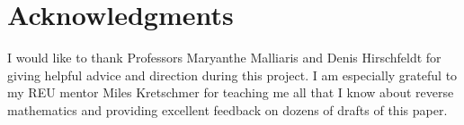 \documentclass{amsart}
\begin{document}
	\section*{Acknowledgments}
	
	I would like to thank Professors Maryanthe Malliaris and Denis Hirschfeldt for giving helpful advice and direction during this project. I am especially grateful to my REU mentor Miles Kretschmer for teaching me all that I know about reverse mathematics and providing excellent feedback on dozens of drafts of this paper.
	
	\printbibliography
	
	
\end{document}
